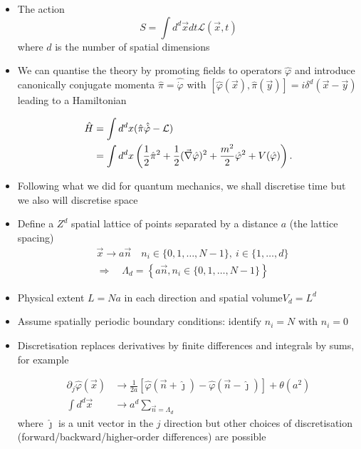 \begin{itemize}
  \item The action 
  \begin{equation}
      S=\int d^{d} \vec{x} d t \mathcal{L}(\vec{x}, t)
  \end{equation} where $d$ is the number of spatial dimensions
  \item We can quantise the theory by promoting fields to operators \(\hat{\varphi}\) and introduce canonically conjugate momenta \(\hat{\pi}=\hat{\dot\varphi}\) with \([\hat{\varphi}(\vec{x}), \hat{\pi}(\vec{y})]=i \delta^{d}(\vec{x}-\vec{y})\)  leading to a Hamiltonian

\begin{equation}
\begin{aligned}
\hat{H} & =\int d^{d} x(\hat{\pi} \hat{\dot{\varphi}}-{\cal L}) \\
& =\int d^{d} x\left(\frac{1}{2} \hat{\pi}^{2}+\frac{1}{2}(\vec{\nabla} \hat{\varphi})^{2}+\frac{m^{2}}{2} \hat{\varphi}^{2}+V(\hat{\varphi})\right).
\end{aligned}
\end{equation}

  \item Following what we did for quantum mechanics, we shall discretise time but we also will discretise space
  \item Define a $Z^d$ spatial lattice of points separated by a distance $a$ (the lattice spacing)
\begin{equation}
\begin{aligned}
& \vec{x} \rightarrow a \vec{n} \quad n_{i} \in\{0,1, \ldots, N-1\},\ i\in\{1,\ldots,d\} \\
& \Rightarrow \quad \Lambda_{d}=\left\{a \vec{n}, n_{i} \in\{0,1, \ldots, N-1\}\right\}
\end{aligned}
\end{equation}

  \item Physical extent $L=Na$ in each direction and spatial volume\(V_{d}=L^{d}\)\\
  \item Assume spatially periodic boundary conditions: identify \(n_{i}=N\) with \(n_{i}=0\)
  \item Discretisation replaces derivatives by finite differences and integrals by sums, for example

\begin{equation}
\begin{aligned}
\partial_{j} \hat{\varphi}(\vec{x}) & \longrightarrow \frac{1}{2 a}[\hat{\varphi}(\vec{n}+\hat{\jmath})-\hat{\varphi}(\vec{n}-\hat{\jmath})]+\theta\left(a^{2}\right) 
 \\
\int d^{d} \vec{x} & \rightarrow a^{d} \sum_{\vec{n}=\Lambda_{d}}
\end{aligned}
\end{equation}
where $ \hat{\jmath}$ is a unit vector in the $j$ direction
but other choices of discretisation (forward/backward/higher-order differences) are possible


\end{itemize}
